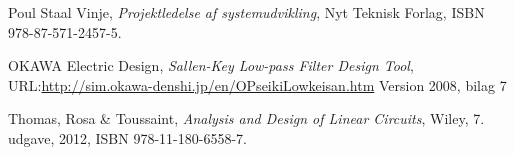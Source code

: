 \begin{thebibliography}{9}
	
	Poul Staal Vinje,
	\emph{Projektledelse af systemudvikling},
	Nyt Teknisk Forlag,
	ISBN 978-87-571-2457-5.
	
	OKAWA Electric Design,
	\emph{Sallen-Key Low-pass Filter Design Tool},
	URL:\url{http://sim.okawa-denshi.jp/en/OPseikiLowkeisan.htm}
	Version 2008,
	bilag 7
	
	
	Thomas, Rosa \& Toussaint,
	\emph{Analysis and Design of Linear Circuits},
	Wiley,
	7. udgave, 
	2012, ISBN  978-11-180-6558-7. 
	
	
\end{thebibliography}


